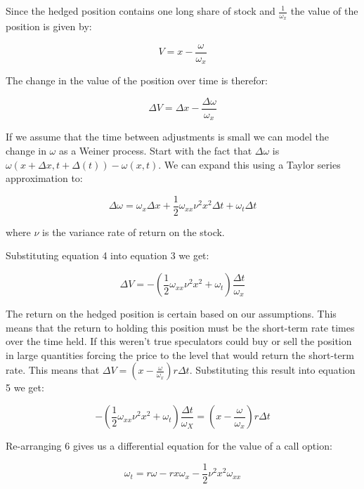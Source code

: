 \documentclass{article}
\begin{document}
Since the hedged position contains one long share of stock and $\frac{1}{\omega_{x}}$ the value of the position is given by:

\begin{equation}
V=x-\frac{\omega}{\omega_{x}}
\end{equation}

The change in the value of the position over time is therefor:

\begin{equation}
\Delta{V}=\Delta{x}-\frac{\Delta{\omega}}{\omega_{x}}
\end{equation}

If we assume that the time between adjustments is small we can model the change in $\omega$ as a Weiner process.  Start with the fact that $\Delta{\omega}$ is $\omega(x + \Delta{x}, t + \Delta(t)) - \omega(x,t)$.  We can expand this using a Taylor series approximation to:

\begin{equation}
\Delta{\omega}=\omega_{x}\Delta{x} + \frac{1}{2}\omega_{xx}\nu^{2}x^{2}\Delta{t} + \omega_{t}\Delta{t}
\end{equation}

where $\nu$ is the variance rate of return on the stock.

Substituting equation 4 into equation 3 we get:

\begin{equation}
\Delta{V}=-(\frac{1}{2}\omega_{xx}\nu^{2}x^{2}+\omega_{t})\frac{\Delta{t}}{\omega_{x}}
\end{equation}

The return on the hedged position is certain based on our assumptions.  This means that the return to holding this position must be the short-term rate times over the time held.  If this weren't true speculators could buy or sell the position in large quantities forcing the price to the level that would return the short-term rate.  This means that $\Delta{V} = (x-\frac{\omega}{\omega_{x}})r\Delta{t}$.  Substituting this result into equation 5 we get:

\begin{equation}
-(\frac{1}{2}\omega_{xx}\nu^{2}x^{2}+\omega_{t})\frac{\Delta{t}}{\omega_{X}}=(x-\frac{\omega}{\omega_{x}})r\Delta{t}
\end{equation}

Re-arranging 6 gives us a differential equation for the value of a call option:

\begin{equation}
\omega_{t}=r\omega-rx\omega_{x}-\frac{1}{2}\nu^{2}x^{2}\omega_{xx}
\end{equation}
\end{document}
